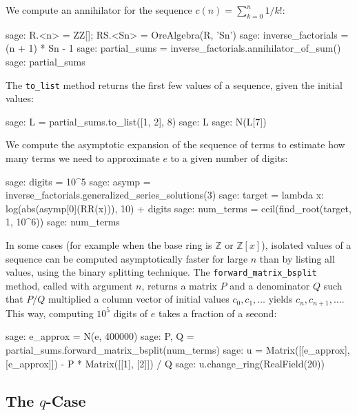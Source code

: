 \documentclass{amsart}
\begin{document}
\smallskip

We compute an annihilator for the sequence
$c(n) = \sum_{k=0}^n 1 / k!$:

\begin{sageexample}
  sage: R.<n> = ZZ[]; RS.<Sn> = OreAlgebra(R, 'Sn')
  sage: inverse_factorials = (n + 1) * Sn - 1
  sage: partial_sums = inverse_factorials.annihilator_of_sum()
  sage: partial_sums
\end{sageexample}

The \verb|to_list| method returns the first few values of a sequence,
given the initial values:

\begin{sageexample}
  sage: L = partial_sums.to_list([1, 2], 8)
  sage: L
  sage: N(L[7])
\end{sageexample}

We compute the asymptotic expansion of the sequence of terms
to estimate how many terms we need to approximate $e$ to a given
number of digits:

\begin{sageexample}
  sage: digits = 10^5
  sage: asymp = inverse_factorials.generalized_series_solutions(3)
  sage: target = lambda x: log(abs(asymp[0](RR(x))), 10) + digits
  sage: num_terms = ceil(find_root(target, 1, 10^6))
  sage: num_terms
\end{sageexample}

In some cases (for example when the base ring is $\mathbb{Z}$ or
$\mathbb{Z}[x]$), isolated values of a sequence can be
computed asymptotically faster for large $n$ than by listing all
values, using the binary splitting technique.
The \verb|forward_matrix_bsplit| method, called with argument $n$,
returns a matrix $P$ and a denominator $Q$ such that $P / Q$ multiplied a
column vector of initial values $c_0, c_1, \ldots$
yields $c_n, c_{n+1}, \ldots$.
This way, computing $10^5$ digits of $e$ takes a fraction of a second:

\begin{sageexample}
  sage: e_approx = N(e, 400000)
  sage: P, Q = partial_sums.forward_matrix_bsplit(num_terms)
  sage: u = Matrix([[e_approx], [e_approx]]) - P * Matrix([[1], [2]]) / Q
  sage: u.change_ring(RealField(20))
\end{sageexample}


\subsection{The $q$-Case}
\end{document}
